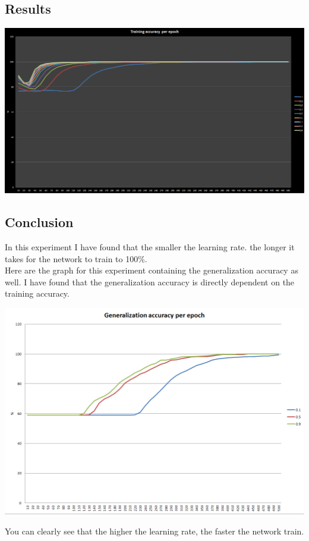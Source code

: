 \documentclass[pdftex,10pt,a4paper]{report}
\begin{document}
\subsection{Results}
\begin{center}
	\includegraphics[scale=0.5]{charts/1_other}
\end{center}
\subsection{Conclusion}
In this experiment I have found that the smaller the learning rate. the longer it takes for the network to train to 100\%.\\
Here are the graph for this experiment containing the generalization accuracy as well. I have found that the generalization accuracy is directly dependent on the training accuracy.
\begin{center}
	\includegraphics[scale=0.5]{charts/1_other_ag}
\end{center}
You can clearly see that the higher the learning rate, the faster the network train.
\end{document}
